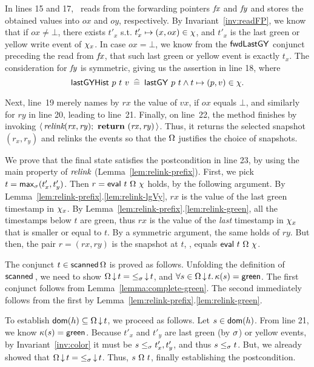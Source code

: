 In lines 15 and 17, \jyscan\ reads from the forwarding pointers $\mathit{fx}$
and $\mathit{fy}$ and stores the obtained values into $ox$ and $oy$,
respectively.  By Invariant~\ref{inv:readFP}, we know that if $ox \neq
\bot$, there exists $t'_x$ s.t. $t'_x \mapsto (x,ox) \in \chi$, and
$t'_x$ is the last green or yellow write event of $\chi_x$.  In case
$ox = \bot$, we know from the ${\mathsf{fwdLastGY}}$ conjunct preceding the read
from $\mathit{fx}$, that such last green or yellow event is exactly $t_x$.
%
The consideration for $\mathit{fy}$ is symmetric, giving us the assertion in
line 18, where
\[{\mathsf{lastGYHist}}\ p\ t\ v \mathrel{\:\widehat{=}\:} \mathsf{lastGY}\ p\ t \wedge t \mapsto (p, v) \in \chi.\]

Next, line~19 merely names by $rx$ the value of $vx$, if $ox$ equals
$\bot$, and similarly for $ry$ in line 20, leading to
line~21. Finally, on line~22, the method finishes by invoking
$\langle\,\textit{relink}(\mathit{rx}, \mathit{ry});\ \text{\textbf{return}}\ (\mathit{rx},
\mathit{ry})\,\rangle$. Thus, it returns the selected snapshot $(r_x,r_y)$
and relinks the events so that the $\Omega$ justifies the choice
of snapshots.



We prove that the final state satisfies the postcondition in line 23,
by using the main property of $\textit{relink}$
(Lemma~\ref{lem:relink-prefix}).
%
First, we pick $t = \mathsf{max}_{\sigma}(t'_x, t'_y)$. Then $r =
\mathsf{eval}\ t\ \Omega\ \chi$ holds, by the following argument. By
Lemma~\ref{lem:relink-prefix}.\ref{lem:relink-lgVy}, $rx$ is the value
of the last green timestamp in $\chi_x$. By
Lemma~\ref{lem:relink-prefix}.\ref{lem:relink-green}, all the
timestamps below $t$ are green, thus $rx$ is the value of the
\emph{last} timestamp in $\chi_x$ that is smaller or equal to $t$.  By
a symmetric argument, the same holds of $ry$. But then, the pair $r =
(rx, ry)$ is the snapshot at $t$, \ie, equals
$\eval\ t\ \stableorder\ \hist$.

The conjunct $t \in \mathsf{scanned}\,\Omega$ is proved as
follows. Unfolding the definition of $\scanned$, we need to show
$\Omega\,{\downarrow}\,t = {\mathrel{\leq_\sigma}}\,{\downarrow}\,t$, and $\forall s\in
\Omega\,{\downarrow}\,t\mathord{.}\, \kappa(s) = \mathsf{green}$.  The first
conjunct follows from Lemma~\ref{lemma:complete-green}. The second
immediately follows from the first by
Lemma~\ref{lem:relink-prefix}.\ref{lem:relink-green}.

To establish $\mathsf{dom}(h) \subseteq \Omega\,{\downarrow}\,t$, we proceed
as follows. Let $s \in \mathsf{dom}(h)$. From line 21, we know $\kappa(s) =
\mathsf{green}$. Because $t'_x$ and $t'_y$ are last green (by
$\sigma$) or yellow events, by Invariant~\ref{inv:color} it must be
$s \mathrel{\leq_\sigma} t'_x, t'_y$, and thus $s \mathrel{\leq_\sigma} t$. But, we already showed that
$\Omega\,{\downarrow}\,t = {\mathrel{\leq_\sigma}}\,{\downarrow}\,t$. Thus,
$s\ {\stableorder}\ t$, finally establishing the postcondition.


